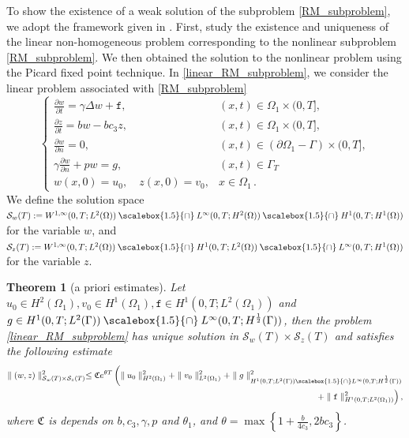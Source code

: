 \documentclass[11pt]{article}
\newcommand*{\medcap}{\mathbin{\scalebox{1.5}{\ensuremath{\cap}}}}
\newtheorem{theorem}{Theorem}[section]
\begin{document}
To show the existence of a weak solution of the subproblem \eqref{RM_subproblem}, we adopt the framework given in \cite{caetano2010schwarz}. First, study the existence and uniqueness of the linear non-homogeneous problem corresponding to the nonlinear subproblem \eqref{RM_subproblem}. We then obtained the solution to the nonlinear problem using the Picard fixed point technique. In \eqref{linear_RM_subproblem}, we consider the linear problem associated with \eqref{RM_subproblem} 
\begin{equation}\label{linear_RM_subproblem}
\begin{cases}
\frac{\partial w}{\partial t}  = \gamma \Delta w + \mathtt{f}, & (x,t)\in\Omega_1\times(0,T],\\
\frac{\partial z}{\partial t} = bw - bc_3z , & (x,t)\in\Omega_1\times(0,T],\\
\frac{\partial w}{\partial n}=0, & (x,t)\in\left(\partial\Omega_1 - \Gamma\right)\times(0,T],\\
\gamma\frac{\partial w}{\partial n} + pw
 = g,  & (x,t)\in\Gamma_T\\
w(x,0)=u_0,  \quad z(x,0)=v_0, &  x\in \Omega_1 \,.
\end{cases}
\end{equation}
We 
define the solution space $\mathcal{S}_{w}(T):=W^{1,\infty}(0,T; L^2(\Omega))\medcap L^{\infty}(0, T; H^2(\Omega))\medcap H^1(0, T; H^1(\Omega))$ for the variable $w$, and 
$\mathcal{S}_{z}(T):=W^{1,\infty}(0,T; L^2(\Omega))\medcap H^1(0, T; L^2(\Omega)) \medcap L^{\infty}(0, T; H^1(\Omega))$ for the variable $z$.
\begin{theorem}[a priori estimates]\label{thm_existence_linear}
Let $u_0\in H^2(\Omega_1), v_0\in H^1(\Omega_1), \mathtt{f}\in H^1(0, T; L^2(\Omega_1))$ and $g\in H^1(0, T;L^2(\Gamma))\medcap L^{\infty}(0, T;H^{\frac{1}{2}}(\Gamma))$, then the problem \eqref{linear_RM_subproblem} has unique solution in $\mathcal{S}_{w}(T) \times \mathcal{S}_{z}(T)$ and satisfies the following estimate 
\begin{equation}\label{estimate_galerkin}
\begin{aligned}
\parallel (w, z)\parallel_{\mathcal{S}_{w}(T) \times \mathcal{S}_{z}(T)}^2 \leq \mathfrak{C}e^{\theta T} \left( \parallel u_0\parallel^2_{H^2(\Omega_1)} + \parallel v_0\parallel^2_{L^2(\Omega_1)}  + \parallel g\parallel^2_{H^1(0, T;L^2(\Gamma))\medcap L^{\infty}(0, T;H^{\frac{1}{2}}(\Gamma))} \right. \\
\left.+ \parallel \mathtt{f}\parallel_{H^{1}(0,T; L^2(\Omega_1))}^2 \right),
\end{aligned}
\end{equation}
where $\mathfrak{C}$ is depends on $b, c_3, \gamma, p$ and $\theta_1$, and $\theta=\max \left \{1+\frac{b}{4c_3}, 2bc_3 \right \}$.
\end{theorem}
\end{document}
